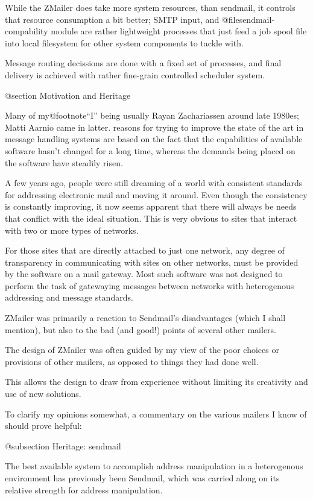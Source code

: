 While the ZMailer does take more system resources, than
sendmail, it controls that resource consumption a bit better;
SMTP input, and @file{sendmail}-compability module are rather
lightweight processes that just feed a job spool file into
local filesystem for other system components to tackle with.

Message routing decissions are done with a fixed set of processes,
and final delivery is achieved with rather fine-grain controlled
scheduler system.


@section Motivation and Heritage

Many of my@footnote{``I'' being usually Rayan Zachariassen
around late 1980es;  Matti Aarnio came in latter.}
reasons for trying to improve the state of the art in message
handling systems are based on the fact that the capabilities
of available software hasn't changed for a long time, whereas
the demands being placed on the software have steadily risen.

A few years ago, people were still dreaming of a world with
consistent standards for addressing electronic mail and moving
it around.
Even though the consistency is constantly improving, it now
seems apparent that there will always be needs that conflict
with the ideal situation.
This is very obvious to sites that interact with two or more
types of networks.

For those sites that are directly attached to just one network,
any degree of transparency in communicating with sites on other
networks, must be provided by the software on a mail gateway.
Most such software was not designed to perform the task of
gatewaying messages between networks with heterogenous addressing
and message standards.

ZMailer was primarily a reaction to Sendmail's disadvantages
(which I shall mention), but also to the bad (and good!) points
of several other mailers.

The design of ZMailer was often guided by my view of the poor
choices or provisions of other mailers, as opposed to things
they had done well.

This allows the design to draw from experience without limiting
its creativity and use of new solutions.

To clarify my opinions somewhat, a commentary on the various
mailers I know of should prove helpful:


@subsection Heritage: sendmail

The best available system to accomplish address manipulation in
a heterogenous environment has previously been Sendmail, which
was carried along on its relative strength for address manipulation.

